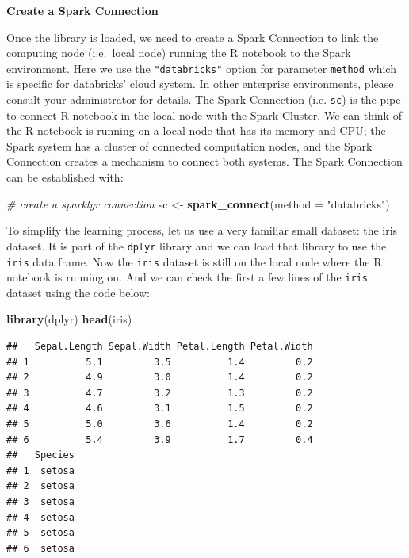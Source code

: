 \documentclass[12pt,]{krantz}
\makeatletter
\newenvironment{Shaded}{\begin{snugshade}}{\end{snugshade}}
\newcommand{\CommentTok}[1]{\textcolor[rgb]{0.37,0.37,0.37}{\textit{#1}}}
\newcommand{\DataTypeTok}[1]{\textcolor[rgb]{0.27,0.27,0.27}{#1}}
\newcommand{\KeywordTok}[1]{\textcolor[rgb]{0.27,0.27,0.27}{\textbf{#1}}}
\newcommand{\NormalTok}[1]{#1}
\newcommand{\StringTok}[1]{\textcolor[rgb]{0.5,0.5,0.5}{#1}}
\newenvironment{kframe}{%
\medskip{}
\setlength{\fboxsep}{.8em}
 \def\at@end@of@kframe{}%
 \ifinner\ifhmode%
  \def\at@end@of@kframe{\end{minipage}}%
  \begin{minipage}{\columnwidth}%
 \fi\fi%
 \def\FrameCommand##1{\hskip\@totalleftmargin \hskip-\fboxsep
 \colorbox{shadecolor}{##1}\hskip-\fboxsep
     \hskip-\linewidth \hskip-\@totalleftmargin \hskip\columnwidth}%
 \MakeFramed {\advance\hsize-\width
   \@totalleftmargin\z@ \linewidth\hsize
   \@setminipage}}%
 {\par\unskip\endMakeFramed%
 \at@end@of@kframe}
\renewenvironment{Shaded}{\begin{kframe}}{\end{kframe}}
\makeatother
\begin{document}
\textbf{Create a Spark Connection}

Once the library is loaded, we need to create a Spark Connection to link the computing node (i.e.~local node) running the R notebook to the Spark environment. Here we use the \texttt{"databricks"} option for parameter \texttt{method} which is specific for databricks' cloud system. In other enterprise environments, please consult your administrator for details. The Spark Connection (i.e. \texttt{sc}) is the pipe to connect R notebook in the local node with the Spark Cluster. We can think of the R notebook is running on a local node that has its memory and CPU; the Spark system has a cluster of connected computation nodes, and the Spark Connection creates a mechanism to connect both systems. The Spark Connection can be established with:

\begin{Shaded}
\begin{Highlighting}[]
\CommentTok{# create a sparklyr connection}
\NormalTok{sc <-}\StringTok{ }\KeywordTok{spark_connect}\NormalTok{(}\DataTypeTok{method =} \StringTok{"databricks"}\NormalTok{)}
\end{Highlighting}
\end{Shaded}

To simplify the learning process, let us use a very familiar small dataset: the iris dataset. It is part of the \texttt{dplyr} library and we can load that library to use the \texttt{iris} data frame. Now the \texttt{iris} dataset is still on the local node where the R notebook is running on. And we can check the first a few lines of the \texttt{iris} dataset using the code below:

\begin{Shaded}
\begin{Highlighting}[]
\KeywordTok{library}\NormalTok{(dplyr)}
\KeywordTok{head}\NormalTok{(iris)}
\end{Highlighting}
\end{Shaded}

\begin{verbatim}
##   Sepal.Length Sepal.Width Petal.Length Petal.Width
## 1          5.1         3.5          1.4         0.2
## 2          4.9         3.0          1.4         0.2
## 3          4.7         3.2          1.3         0.2
## 4          4.6         3.1          1.5         0.2
## 5          5.0         3.6          1.4         0.2
## 6          5.4         3.9          1.7         0.4
##   Species
## 1  setosa
## 2  setosa
## 3  setosa
## 4  setosa
## 5  setosa
## 6  setosa
\end{verbatim}
\end{document}
